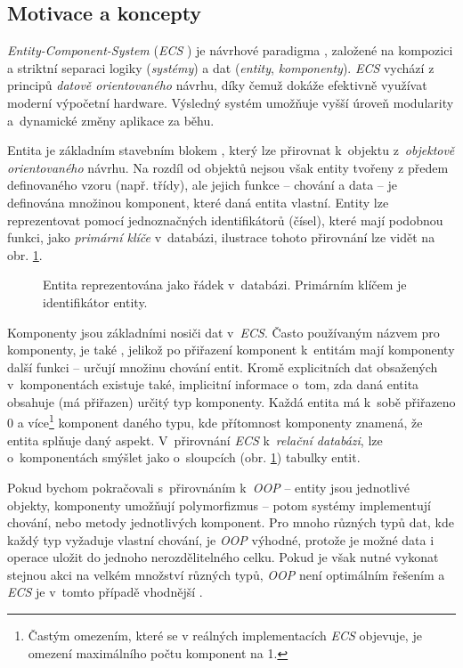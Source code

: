 \subsection{Motivace a koncepty}

\emph{Entity-Component-System} (\emph{ECS} \cite{WhatIsECS, UnderstandingECS}) je návrhové paradigma \cite{EntitySystemsFuture}, založené na kompozici a striktní separaci logiky (\emph{systémy}) a dat (\emph{entity}, \emph{komponenty}). \emph{ECS} vychází z principů \emph{datově orientovaného} návrhu, díky čemuž dokáže efektivně využívat moderní výpočetní hardware. Výsledný systém umožňuje vyšší úroveň modularity a~dynamické změny aplikace za běhu.

Entita je základním stavebním blokem \cite{EntitySystemsFuture}, který lze přirovnat k~objektu z~\emph{objektově orientovaného} návrhu. Na rozdíl od objektů nejsou však entity tvořeny z předem definovaného vzoru (např. třídy), ale jejich funkce -- chování a data -- je definována množinou komponent, které daná entita vlastní. Entity lze reprezentovat pomocí jednoznačných identifikátorů (čísel), které mají podobnou funkci, jako \emph{primární klíče} v~databázi, ilustrace tohoto přirovnání lze vidět na obr. \ref{Fig:ECSDB}.

\begin{figure}[H]
	\centering
	\caption{Entita reprezentována jako řádek v~databázi. Primárním klíčem je identifikátor entity.}
	\label{Fig:ECSDB}
\end{figure}

Komponenty jsou základními nosiči dat v~\emph{ECS}. Často používaným názvem pro komponenty, je také  \cite{EntitySystemsFuture}, jelikož po přiřazení komponent k~entitám mají komponenty další funkci -- určují množinu chování entit. Kromě explicitních dat obsažených v~komponentách existuje také, implicitní informace o~tom, zda daná entita obsahuje (má přiřazen) určitý typ komponenty. Každá entita má k~sobě přiřazeno 0 a více\footnote{Častým omezením, které se v reálných implementacích \emph{ECS} objevuje, je omezení maximálního počtu komponent na 1.} komponent daného typu, kde přítomnost komponenty znamená, že entita splňuje daný aspekt. V~přirovnání \emph{ECS} k~\emph{relační databázi}, lze o~komponentách smýšlet jako o~sloupcích (obr. \ref{Fig:ECSDB}) tabulky entit.

Pokud bychom pokračovali s~přirovnáním k~\emph{OOP} -- entity jsou jednotlivé objekty, komponenty umožňují polymorfizmus -- potom systémy implementují chování, nebo metody jednotlivých komponent. Pro mnoho různých typů dat, kde každý typ vyžaduje vlastní chování, je \emph{OOP} výhodné, protože je možné data i operace uložit do jednoho nerozdělitelného celku. Pokud je však nutné vykonat stejnou akci na velkém množství různých typů, \emph{OOP} není optimálním řešením a \emph{ECS} je v~tomto případě vhodnější \cite{EntitySystemsFuture}. 

